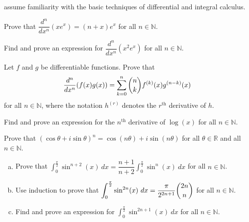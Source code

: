  assume familiarity with the basic techniques of differential and integral calculus.

\begin{chapex}
\label{cqCalculusBegin}
Prove that $\dfrac{d^n}{dx^n}(xe^x) = (n+x)e^x$ for all $n \in \mathbb{N}$.
\end{chapex}

\begin{chapex}
Find and prove an expression for $\dfrac{d^n}{dx^n}(x^2e^x)$ for all $n \in \mathbb{N}$.
\end{chapex}

\begin{chapex}
Let $f$ and $g$ be differentiable functions. Prove that
\[ \dfrac{d^n}{dx^n}(f(x)g(x)) = \sum_{k=0}^n \dbinom{n}{k} f^{(k)}(x) g^{(n-k)}(x) \]
for all $n \in \mathbb{N}$, where the notation $h^{(r)}$ denotes the $r^{\text{th}}$ derivative of $h$.
\end{chapex}

\begin{chapex}
Find and prove an expression for the $n^{\text{th}}$ derivative of $\log(x)$ for all $n \in \mathbb{N}$.
\end{chapex}

\begin{chapex}
\label{cqDeMoivre}
Prove that $(\cos \theta + i \sin \theta)^n = \cos (n\theta) + i \sin (n\theta)$ for all $\theta \in \mathbb{R}$ and all $n \in \mathbb{N}$.
\end{chapex}

\begin{chapex}
\label{cqIntegralOfSinToTheN}
\label{cqCalculusEnd}
\begin{enumerate}[(a)]
\item Prove that $\displaystyle \int_0^{\frac{\pi}{2}} \sin^{n+2}(x)~dx = \dfrac{n+1}{n+2} \int_0^{\frac{\pi}{2}} \sin^n(x)~dx$ for all $n \in \mathbb{N}$.
\item Use induction to prove that $\displaystyle \int_0^{\frac{\pi}{2}} \sin^{2n}(x)~dx = \dfrac{\pi}{2^{2n+1}} \dbinom{2n}{n}$ for all $n \in \mathbb{N}$.
\item Find and prove an expression for $\displaystyle \int_0^{\frac{\pi}{2}} \sin^{2n+1}(x)~dx$ for all $n \in \mathbb{N}$.
\end{enumerate}
\end{chapex}

